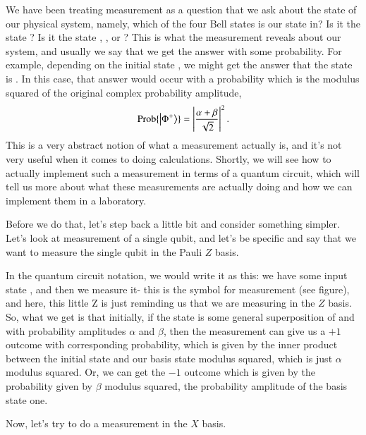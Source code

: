 We have been treating measurement as a question that we ask about the state of our physical system, namely, which of the four Bell states is our state in? Is it the state \ket{\Phi^+}? Is it the state \ket{\Phi^-}, \ket{\Psi^+}, or \ket{\Psi^-}? This is what the measurement reveals about our system, and usually we say that we get the answer with some probability. For example, depending on the initial state \ket{\psi}, we might get the answer that the state is \ket{\Phi^+}. In this case, that answer would occur with a probability which is the modulus squared of the original complex probability amplitude,
\begin{equation}
\operatorname{Prob}\{\left| \Phi^+ \right\rangle\}=\left|\frac{\alpha+\beta}{\sqrt{2}}\right|^2.
\end{equation}
This is a very abstract notion of what a measurement actually is, and it's not  very useful when it comes to doing calculations. Shortly, we will see how to actually implement such a measurement in terms of a quantum circuit, which will tell us more about what these measurements are actually doing and how we can implement them in a laboratory.

Before we do that, let's step back a little bit and consider something simpler. Let's look at measurement of a single qubit, and let's be specific and say that we want to measure the single qubit in the Pauli $Z$ basis.


In the quantum circuit notation, we would write it as this: we have some input state \ket{\psi}, and then we measure it- this is the symbol for measurement (see figure), and here, this little Z is just reminding us that we are measuring in the $Z$ basis.  So, what we get is that initially, if the state is some general superposition of  and  with probability amplitudes $\alpha$ and $\beta$, then the measurement can give us a $+1$ outcome with corresponding probability, which is given by the inner product between the initial state and our basis state  modulus squared, which is just $\alpha$ modulus squared. Or, we can get the  $-1$ outcome which is given by the probability given by $\beta$ modulus squared, the probability amplitude of the basis state one.

Now, let's try to do a measurement in the $X$ basis.

